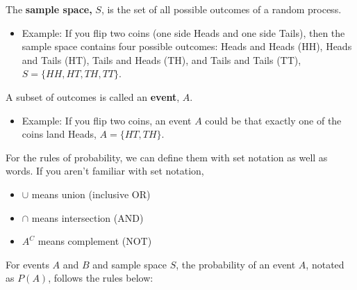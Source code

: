 \documentclass[]{book}
\providecommand{\tightlist}{%
  \setlength{\itemsep}{0pt}\setlength{\parskip}{0pt}}
\begin{document}
The \textbf{sample space,} \(S\), is the set of all possible outcomes of a random process.

\begin{itemize}
\tightlist
\item
  Example: If you flip two coins (one side Heads and one side Tails), then the sample space contains four possible outcomes: Heads and Heads (HH), Heads and Tails (HT), Tails and Heads (TH), and Tails and Tails (TT), \(S = \{HH,HT,TH,TT\}\).
\end{itemize}

A subset of outcomes is called an \textbf{event}, \(A\).

\begin{itemize}
\tightlist
\item
  Example: If you flip two coins, an event \(A\) could be that exactly one of the coins land Heads, \(A = \{HT,TH\}\).
\end{itemize}

For the rules of probability, we can define them with set notation as well as words. If you aren't familiar with set notation,

\begin{itemize}
\tightlist
\item
  \(\cup\) means union (inclusive OR)
\item
  \(\cap\) means intersection (AND)
\item
  \(A^C\) means complement (NOT)
\end{itemize}

For events \(A\) and \(B\) and sample space \(S\), the probability of an event \(A\), notated as \(P(A)\), follows the rules below:
\end{document}
